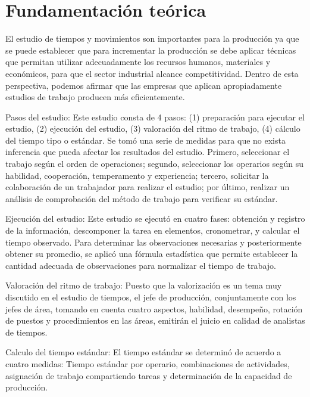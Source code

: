     \section{Fundamentación teórica}
        El estudio de tiempos y movimientos son importantes para la producción ya que se puede establecer que para incrementar la producción se debe aplicar técnicas que permitan utilizar adecuadamente los recursos humanos, materiales y económicos, para que el sector industrial alcance competitividad. Dentro de esta perspectiva, podemos afirmar que las empresas que aplican apropiadamente estudios de trabajo producen más eficientemente.
        
        Pasos del estudio:
        Este estudio consta de 4 pasos: (1) preparación para ejecutar el estudio, (2) ejecución del estudio, (3) valoración del ritmo de trabajo, (4) cálculo del tiempo tipo o estándar.
        Se tomó una serie de medidas para que no exista inferencia que pueda afectar los resultados del estudio. Primero, seleccionar el trabajo según el orden de operaciones; segundo, seleccionar los operarios según su habilidad, cooperación, temperamento y experiencia; tercero, solicitar la colaboración de un trabajador para realizar el estudio; por último, realizar un análisis de comprobación del método de trabajo para verificar su estándar.
    
        Ejecución del estudio: 
        Este estudio se ejecutó en cuatro fases: obtención y registro de la información, descomponer la tarea en elementos, cronometrar, y calcular el tiempo observado. Para determinar las observaciones necesarias y posteriormente obtener su promedio, se aplicó una fórmula estadística que permite establecer la cantidad adecuada de observaciones para normalizar el tiempo de trabajo.
    
        
        Valoración del ritmo de trabajo:
        Puesto que la valorización es un tema muy discutido en el estudio de tiempos, el jefe de producción, conjuntamente con los jefes de área, tomando en cuenta cuatro aspectos, habilidad, desempeño, rotación de puestos y procedimientos en las áreas, emitirán el juicio en calidad de analistas de tiempos.
    
        
        Calculo del tiempo estándar: 
        El tiempo estándar se determinó de acuerdo a cuatro medidas: Tiempo estándar por operario, combinaciones de actividades, asignación de trabajo compartiendo tareas y determinación de la capacidad de producción.
        \cite{Fundamentacionteorica}
    
